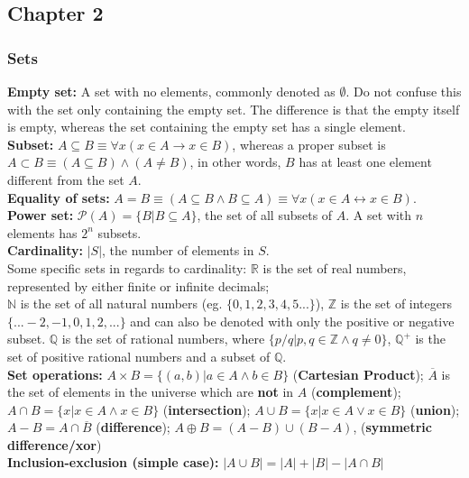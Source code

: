 \documentclass[12pt]{article}
\newcommand{\PP}{\mathscr{P}}
\newcommand{\R}{\mathbb{R}}
\newcommand{\N}{\mathbb{N}}
\newcommand{\Z}{\mathbb{Z}}
\begin{document}
\subsection{Chapter 2}
\subsubsection{Sets}
\textbf{Empty set:} A set with no elements, commonly denoted as $\emptyset$. Do not confuse this with the set only containing the empty set. The difference is that the empty itself is empty, whereas the set containing the empty set has a single element. \\
\textbf{Subset:} $A \subseteq B \equiv \forall x(x \in A \rightarrow x \in B)$, whereas a proper subset is $ A \subset B \equiv (A \subseteq B) \wedge (A \neq B)$, in other words, $B$ has at least one element different from the set $A$. \\
\textbf{Equality of sets:} $A = B \equiv (A \subseteq B \wedge B \subseteq A) \equiv \forall x(x \in A \leftrightarrow x \in B)$. \\
\textbf{Power set:} $\PP(A) = \{B | B \subseteq A \}$, the set of all subsets of $A$. A set with $n$ elements has $2^n$ subsets. \\
\textbf{Cardinality:} $|S|$, the number of elements in $S$. \\
Some specific sets in regards to cardinality: $\R$ is the set of real numbers, represented by either finite or infinite decimals; \\
$\N$ is the set of all natural numbers (eg. $\{0,1,2,3,4,5...\}$), $\Z$ is the set of integers $\{... -2, -1, 0, 1, 2, ...\}$ and can also be denoted with only the positive or negative subset. $\mathbb{Q}$ is the set of rational numbers, where $\{ p / q | p, q \in \Z \wedge q \neq 0 \}$, $\mathbb{Q}^+$ is the set of positive rational numbers and a subset of $\mathbb{Q}$. \\
\textbf{Set operations:} $A \times B = \{ (a,b) | a \in A \wedge b \in B\}$ (\textbf{Cartesian Product}); $\overline{A}$ is the set of elements in the universe which are \textbf{not} in $A$ (\textbf{complement}); $A \cap B = \{ x | x \in A \wedge x \in B\}$ (\textbf{intersection}); $A \cup B = \{ x | x \in A \vee x \in B\}$ (\textbf{union}); \\
$A - B = A \cap \overline{B}$ (\textbf{difference}); $A \oplus B = (A - B) \cup (B - A)$, (\textbf{symmetric difference/xor}) \\
\textbf{Inclusion-exclusion (simple case):} $|A \cup B| = |A| + |B| - |A \cap B|$\\
\end{document}
